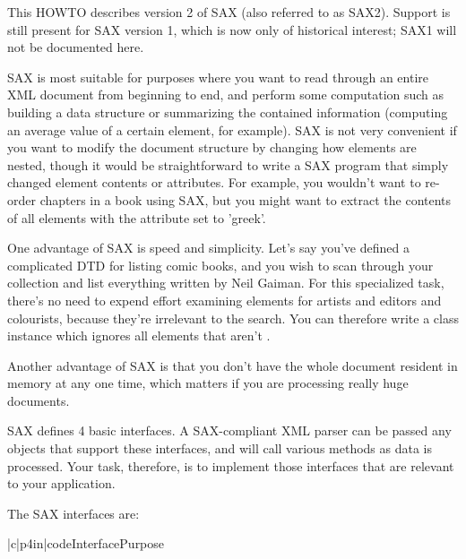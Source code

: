 \documentclass{howto}
\newcommand{\element}[1]{\code{#1}}
\newcommand{\attribute}[1]{\code{#1}}
\begin{document}
This HOWTO describes version 2 of SAX (also referred to as SAX2).
Support is still present for SAX version 1, which is now only of
historical interest; SAX1 will not be documented here.

SAX is most suitable for purposes where you want to read through an
entire XML document from beginning to end, and perform some
computation such as building a data structure or summarizing the
contained information (computing an average value of a certain
element, for example).  SAX is not very convenient if you want to
modify the document structure by changing how elements are nested,
though it would be straightforward to write a SAX program that simply
changed element contents or attributes.  For example, you wouldn't
want to re-order chapters in a book using SAX, but you might want to
extract the contents of all \element{name} elements with the attribute
\attribute{lang} set to 'greek'.

One advantage of SAX is speed and simplicity.  Let's say
you've defined a complicated DTD for listing comic books, and you wish
to scan through your collection and list everything written by Neil
Gaiman.  For this specialized task, there's no need to expend effort
examining elements for artists and editors and colourists, because
they're irrelevant to the search.  You can therefore write a class
instance which ignores all elements that aren't \element{writer}.

Another advantage of SAX is that you don't have the whole document
resident in memory at any one time, which matters if you are
processing really huge documents.  

SAX defines 4 basic interfaces. A SAX-compliant XML parser can be
passed any objects that support these interfaces, and will call
various methods as data is processed.  Your task, therefore, is to
implement those interfaces that are relevant to your application.

The SAX interfaces are:

\begin{tableii}{|c|p{4in}|}{code}{Interface}{Purpose}





\end{tableii}
\end{document}
